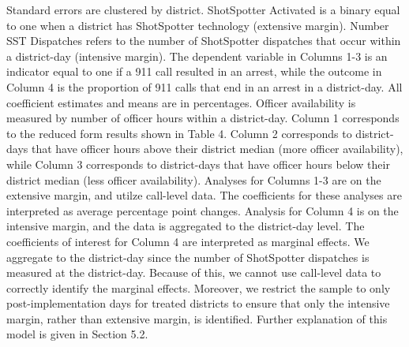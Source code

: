 \begin{table}[H]
\begin{threeparttable}
\begin{tablenotes}
\item Standard errors are clustered by district.                       ShotSpotter Activated is a binary equal to one when                      a district has ShotSpotter technology (extensive margin).                      Number SST Dispatches refers to the number of                      ShotSpotter dispatches that occur within a district-day (intensive margin).                      The dependent variable in Columns 1-3 is an indicator equal to one if a 911 call resulted in an arrest, while the outcome                      in Column 4 is the proportion of 911 calls that end in an arrest in a district-day. All                      coefficient estimates and means are in percentages.                      Officer availability is measured by number of officer hours within a district-day. Column 1                      corresponds to the reduced form results shown in Table 4.                      Column 2 corresponds to district-days that have officer hours above                      their district median (more officer availability), while Column 3 corresponds to district-days that                      have officer hours below their district median (less officer availability). Analyses for                       Columns 1-3 are on the extensive margin, and utilze call-level data. The coefficients for these analyses                      are interpreted as average percentage point changes. Analysis for Column 4                      is on the intensive margin, and the data is aggregated to the district-day level. The                      coefficients of interest for Column 4 are interpreted as marginal effects. We                      aggregate to the district-day since the number of ShotSpotter dispatches is measured                      at the district-day. Because of this, we                      cannot use call-level data to correctly identify the marginal effects. Moreover,                      we restrict the sample to only post-implementation days for treated districts to                      ensure that only the intensive margin, rather than extensive margin, is identified. Further explanation                       of this model is                      given in Section 5.2.                   
\end{tablenotes}
\end{threeparttable}
\end{table}
